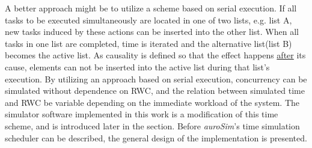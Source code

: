 		A better approach might be to utilize a scheme based on serial execution.
		If all tasks to be executed simultaneously are located in one of two lists, e.g. list A, new tasks induced by these actions can be inserted into the other list.
		When all tasks in one list are completed, time is iterated and the alternative list(list B) becomes the active list.
		As causality is defined so that the effect happens \underline{after} its cause, elements can not be inserted into the active list during that list's execution.
		By utilizing an approach based on serial execution, concurrency can be simulated without dependence on RWC, and the relation between simulated time and RWC be variable depending on the immediate workload of the system.
		The simulator software implemented in this work is a modification of this time scheme, and is introduced later in the section. %
		Before \emph{auroSim}'s time simulation scheduler can be described, the general design of the implementation is presented.



%  

% 
% 
 
